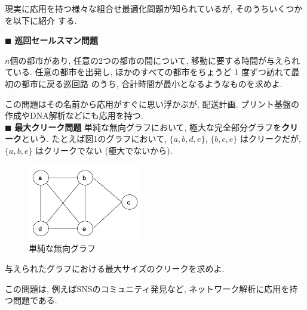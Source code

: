 \documentclass[a4paper,11pt,dvipdfmx]{jsarticle}
\begin{document}
現実に応用を持つ様々な組合せ最適化問題が知られているが, そのうちいくつかを以下に紹介 する.

$\blacksquare$ \textbf{巡回セールスマン問題}
\begin{shadebox}
    $n$個の都市があり, 任意の2つの都市の間について, 移動に要する時間が与えられている. 
    任意の都市を出発し, ほかのすべての都市をちょうど 1 度ずつ訪れて最初の都市に戻る巡回路 のうち, 合計時間が最小となるようなものを求めよ.
\end{shadebox}
この問題はその名前から応用がすぐに思い浮かぶが, 配送計画, プリント基盤の作成やDNA解析などにも応用を持つ. \\

$\blacksquare$ \textbf{最大クリーク問題} 
\quad 単純な無向グラフにおいて, 極大な完全部分グラフを\textbf{クリーク}という. 
たとえば図1のグラフにおいて, $\{a, b, d, e\}$, $\{b, c, e\}$ はクリークだが, $\{a, b, e\}$ はクリークでない (極大でないから).

\begin{figure}[htbp]
    \begin{center}
    \includegraphics[width=50mm]{0519_kr}
    \caption{単純な無向グラフ}
    \end{center}
\end{figure}

\begin{shadebox}
与えられたグラフにおける最大サイズのクリークを求めよ.    
\end{shadebox}
この問題は, 例えばSNSのコミュニティ発見など, ネットワーク解析に応用を持つ問題である. 
\end{document}
